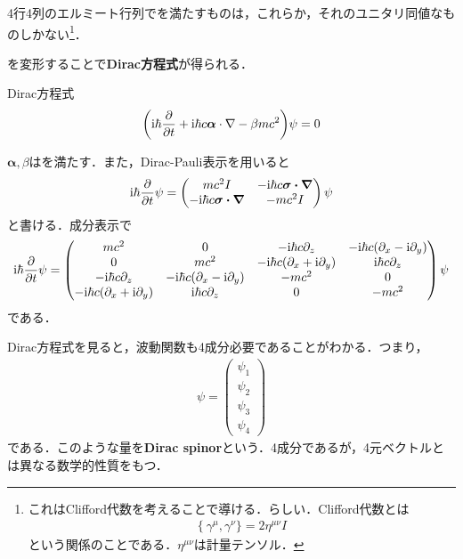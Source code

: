 \documentclass{report}
\begin{document}
4行4列のエルミート行列でを満たすものは，これらか，それのユニタリ同値なものしかない\footnote{
  これはClifford代数を考えることで導ける．らしい．Clifford代数とは
\begin{align}
  \{\ \gamma^\mu, \gamma^\nu\} = 2\eta^{\mu\nu} I
\end{align}
という関係のことである．$\eta^{\mu\nu}$は計量テンソル．
}．

を変形することで\textbf{Dirac方程式}が得られる．
\begin{itembox}[l]{Dirac方程式}
\begin{align}
  \qty(\mathrm{i}\hbar \frac{\partial}{\partial t} + \mathrm{i} \hbar c \bm{\alpha}\cdot \nabla - \beta mc^2)\psi = 0
\end{align}
\end{itembox}
$\bm{\alpha},\beta$はを満たす．また，Dirac-Pauli表示を用いると
\begin{align}
  \mathrm{i}\hbar \frac{\partial}{\partial t}\psi = 
  \begin{pmatrix}
    mc^2 I & -\mathrm{i}\hbar c \bm{\sigma\cdot\nabla}\\
    -\mathrm{i}\hbar c \bm{\sigma\cdot\nabla} & -mc^2 I
  \end{pmatrix}
  \psi
\end{align}
と書ける．成分表示で
\begin{align}
  \label{dirac-eq-matrix}
  \mathrm{i}\hbar\frac{\partial}{\partial t}\psi =
  \begin{pmatrix}
    mc^2 & 0 & -\mathrm{i}\hbar c\partial_z & -\mathrm{i}\hbar c(\partial_x -\mathrm{i} \partial_y)\\
    0 & mc^2 & -\mathrm{i}\hbar c(\partial_x +\mathrm{i} \partial_y) & \mathrm{i}\hbar c\partial_z \\
    -\mathrm{i}\hbar c\partial_z & -\mathrm{i}\hbar c(\partial_x -\mathrm{i} \partial_y) & -mc^2 & 0\\
    -\mathrm{i}\hbar c(\partial_x +\mathrm{i} \partial_y) & \mathrm{i}\hbar c\partial_z & 0 & -mc^2
  \end{pmatrix}
  \psi
\end{align}
である．

Dirac方程式を見ると，波動関数も4成分必要であることがわかる．つまり，
\begin{align}
  \psi = 
  \begin{pmatrix}
    \psi_1\\\psi_2\\\psi_3\\\psi_4
  \end{pmatrix}
\end{align}
である．このような量を\textbf{Dirac spinor}という．4成分であるが，4元ベクトルとは異なる数学的性質をもつ．
\end{document}
